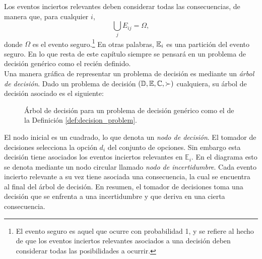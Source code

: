Los eventos inciertos relevantes deben considerar todas las consecuencias, de manera que, para cualquier $i$,
\begin{equation*}
\bigcup_{j} E_{ij} = \Omega,
\end{equation*}
donde $\Omega$ es el evento seguro.\footnote{El evento seguro es aquel que ocurre con probabilidad 1, y se refiere al hecho de que los eventos inciertos relevantes asociados a una decisión deben considerar todas las posibilidades a ocurrir.} En otras palabras, $\mathbb{E}_i$ es una partición del evento seguro. En lo que resta de este capítulo siempre se pensará en un problema de decisión genérico como el recién definido. \\


Una manera gráfica de representar un problema de decisión es mediante un \textit{árbol de decisión}. Dado un problema de decisión $( \mathbb{D}, \mathbb{E}, \mathbb{C}, \succ )$ cualquiera, su árbol de decisión asociado es el siguiente:

\begin{figure}[H]
\centering
{}
\caption{Árbol de decisión para un problema de decisión genérico como el de la Definición \ref{def:decision_problem}.}
\label{dt:generic}
\end{figure}

El nodo inicial es un cuadrado, lo que denota un \textit{nodo de decisión}. El tomador de decisiones selecciona la opción $d_i$ del conjunto de opciones. Sin embargo esta decisión tiene asociados los eventos inciertos relevantes en $\mathbb{E}_i$. En el diagrama esto se denota mediante un nodo circular llamado \textit{nodo de incertidumbre}. Cada evento incierto relevante a su vez tiene asociada una consecuencia, la cual se encuentra al final del árbol de decisión. En resumen, el tomador de decisiones toma una decisión que se enfrenta a una incertidumbre y que deriva en una cierta consecuencia.








